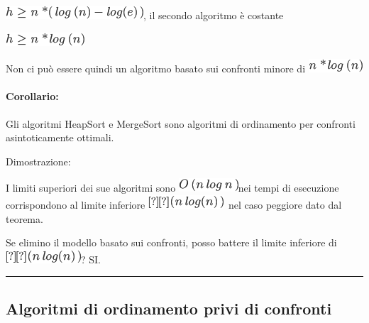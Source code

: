 \documentclass{article}
\let\oldparagraph\paragraph
\renewcommand{\paragraph}[1]{\oldparagraph{#1}\mbox{}}
\begin{document}
\includegraphics{images/image178.png}{, il secondo algoritmo è costante}

\includegraphics{images/image179.png}

{Non ci può essere quindi un algoritmo basato sui confronti minore di
}\includegraphics{images/image180.png}

\hypertarget{h.emyylm3q4aq8}{\paragraph{\texorpdfstring{{Corollario:}}{Corollario:}}\label{h.emyylm3q4aq8}}

{Gli algoritmi HeapSort e MergeSort sono algoritmi di ordinamento per
confronti asintoticamente ottimali.}

{Dimostrazione:}

{I limiti superiori dei sue algoritmi sono
}\includegraphics{images/image181.png}{nei tempi di esecuzione
corrispondono al limite inferiore
}\includegraphics{images/image153.png}{~nel caso peggiore dato dal
teorema.}

{}

{Se elimino il modello basato sui confronti, posso battere il limite
inferiore di }\includegraphics{images/image153.png}{? SI.}

\begin{center}\rule{0.5\linewidth}{\linethickness}\end{center}

\subsection{\texorpdfstring{{}}{}}\label{h.9sera6op4yxc}

\hypertarget{h.p17586cst16}{\subsection{\texorpdfstring{{Algoritmi di
ordinamento privi di
confronti}}{Algoritmi di ordinamento privi di confronti}}\label{h.p17586cst16}}
\end{document}
